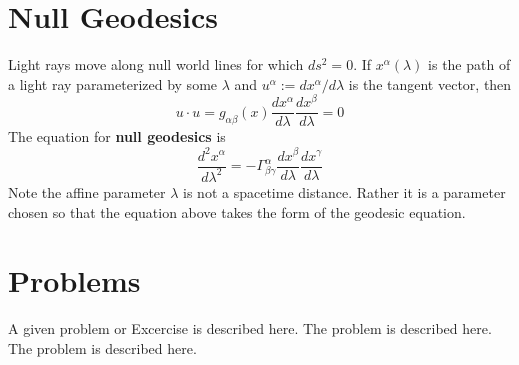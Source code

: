 \section{Null Geodesics}

Light rays move along null world lines for which $ds^2 = 0$. If $x^{\alpha}(\lambda)$ is the path of a light ray parameterized by some $\lambda$ and $u^{\alpha} := dx^{\alpha}/d\lambda$ is the tangent vector, then $$u\cdot u = g_{\alpha\beta}(x)\frac{dx^{\alpha}}{d\lambda}\frac{dx^{\beta}}{d\lambda} = 0$$
The equation for \textbf{null geodesics} is $$\frac{d^2x^{\alpha}}{d\lambda^2} = -\Gamma_{\beta\gamma}^{\alpha}\frac{dx^{\beta}}{d\lambda}\frac{dx^{\gamma}}{d\lambda}$$
Note the affine parameter $\lambda$ is not a spacetime distance. Rather it is a parameter chosen so that the equation above takes the form of the geodesic equation.



\section*{Problems}
%
\begin{prob}
\label{prob1}
A given problem or Excercise is described here. The
problem is described here. The problem is described here.
\end{prob}



